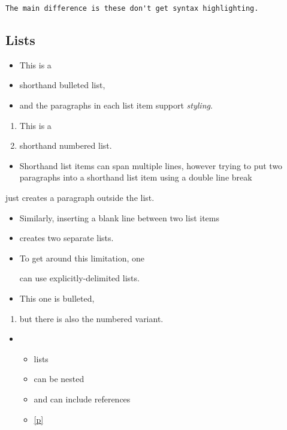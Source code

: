\begin{verbatim}The main difference is these don't get syntax highlighting.\end{verbatim}%
\subsection{Lists\label{lists}}%
\begin{itemize}\item{This is a}%
\item{shorthand bulleted list,}%
\item{and the paragraphs in each list item support \emph{styling}.}\end{itemize}%
\begin{enumerate}\item{This is a}%
\item{shorthand numbered list.}\end{enumerate}%
\begin{itemize}\item{Shorthand list items can span multiple lines, however trying to put two paragraphs into a shorthand list item using a double line break}\end{itemize}%
just creates a paragraph outside the list.

\begin{itemize}\item{Similarly, inserting a blank line between two list items}\end{itemize}%
\begin{itemize}\item{creates two separate lists.}\end{itemize}%
\begin{itemize}\item{To get around this limitation, one

can use explicitly-delimited lists.

}%
\item{This one is bulleted,}\end{itemize}%
\begin{enumerate}\item{but there is also the numbered variant.}\end{enumerate}%
\begin{itemize}\item{\begin{itemize}\item{lists}%
\item{can be nested}%
\item{and can include references}%
\item{\hyperref[container-page-test+u+package+++ml-module-Markup-val-foo]{[p\pageref*{container-page-test+u+package+++ml-module-Markup-val-foo}]}}\end{itemize}%
}\end{itemize}%
